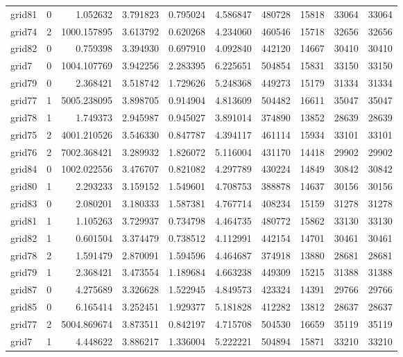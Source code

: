 \documentclass[../../../thesis.tex]{subfiles}
\begin{document}
\begin{longtable}{|l|r|r|r|r|r|r|r|r|r|}
grid81 & 0 & 1.052632 & 3.791823 & 0.795024 & 4.586847 & 480728 & 15818 & 33064 & 33064 \\
grid74 & 2 & 1000.157895 & 3.613792 & 0.620268 & 4.234060 & 460546 & 15718 & 32656 & 32656 \\
grid82 & 0 & 0.759398 & 3.394930 & 0.697910 & 4.092840 & 442120 & 14667 & 30410 & 30410 \\
grid7 & 0 & 1004.107769 & 3.942256 & 2.283395 & 6.225651 & 504854 & 15831 & 33150 & 33150 \\
grid79 & 0 & 2.368421 & 3.518742 & 1.729626 & 5.248368 & 449273 & 15179 & 31334 & 31334 \\
grid77 & 1 & 5005.238095 & 3.898705 & 0.914904 & 4.813609 & 504482 & 16611 & 35047 & 35047 \\
grid78 & 1 & 1.749373 & 2.945987 & 0.945027 & 3.891014 & 374890 & 13852 & 28639 & 28639 \\
grid75 & 2 & 4001.210526 & 3.546330 & 0.847787 & 4.394117 & 461114 & 15934 & 33101 & 33101 \\
grid76 & 2 & 7002.368421 & 3.289932 & 1.826072 & 5.116004 & 431170 & 14418 & 29902 & 29902 \\
grid84 & 0 & 1002.022556 & 3.476707 & 0.821082 & 4.297789 & 430224 & 14849 & 30842 & 30842 \\
grid80 & 1 & 2.293233 & 3.159152 & 1.549601 & 4.708753 & 388878 & 14637 & 30156 & 30156 \\
grid83 & 0 & 2.080201 & 3.180333 & 1.587381 & 4.767714 & 408234 & 15159 & 31278 & 31278 \\
grid81 & 1 & 1.105263 & 3.729937 & 0.734798 & 4.464735 & 480772 & 15862 & 33130 & 33130 \\
grid82 & 1 & 0.601504 & 3.374479 & 0.738512 & 4.112991 & 442154 & 14701 & 30461 & 30461 \\
grid78 & 2 & 1.591479 & 2.870091 & 1.594596 & 4.464687 & 374918 & 13880 & 28681 & 28681 \\
grid79 & 1 & 2.368421 & 3.473554 & 1.189684 & 4.663238 & 449309 & 15215 & 31388 & 31388 \\
grid87 & 0 & 4.275689 & 3.326628 & 1.522945 & 4.849573 & 423324 & 14391 & 29766 & 29766 \\
grid85 & 0 & 6.165414 & 3.252451 & 1.929377 & 5.181828 & 412282 & 13812 & 28637 & 28637 \\
grid77 & 2 & 5004.869674 & 3.873511 & 0.842197 & 4.715708 & 504530 & 16659 & 35119 & 35119 \\
grid7 & 1 & 4.448622 & 3.886217 & 1.336004 & 5.222221 & 504894 & 15871 & 33210 & 33210 \\

\end{longtable}
\end{document}
